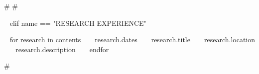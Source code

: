 \begin{minipage}{\textwidth}
{#
#}
  


~{ elif name == "RESEARCH EXPERIENCE" }~
\begin{entrylist}
~{ for research in contents }~
  \entry
    {~{{ research.dates }}~}
    {~{{ research.title }}~}
    {~{{ research.location }}~}
    {~{{ research.description }}~}
~{ endfor }~
\end{entrylist}

{#

    
}
\end{minipage}
